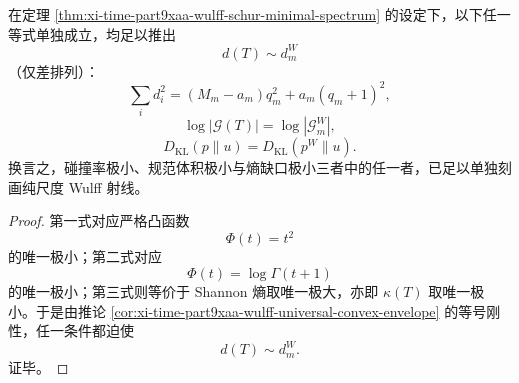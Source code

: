 \begin{theorem}[单泛函刚性]\label{thm:xi-time-part9xaa-single-functional-rigidity}
在定理 \ref{thm:xi-time-part9xaa-wulff-schur-minimal-spectrum} 的设定下，以下任一等式单独成立，均足以推出
\[
d(T)\sim d_m^{W}
\]
（仅差排列）：
\[
\sum_i d_i^2=(M_m-a_m)q_m^2+a_m(q_m+1)^2,
\]
\[
\log|\mathcal G(T)|=\log|\mathcal G_m^{W}|,
\]
\[
D_{\mathrm{KL}}(p\|u)=D_{\mathrm{KL}}(p^{W}\|u).
\]
换言之，碰撞率极小、规范体积极小与熵缺口极小三者中的任一者，已足以单独刻画纯尺度 Wulff 射线。
\end{theorem}
\begin{proof}
第一式对应严格凸函数
\[
\Phi(t)=t^2
\]
的唯一极小；第二式对应
\[
\Phi(t)=\log\Gamma(t+1)
\]
的唯一极小；第三式则等价于 Shannon 熵取唯一极大，亦即 \(\kappa(T)\) 取唯一极小。于是由推论 \ref{cor:xi-time-part9xaa-wulff-universal-convex-envelope} 的等号刚性，任一条件都迫使
\[
d(T)\sim d_m^{W}.
\]
证毕。
\end{proof}

